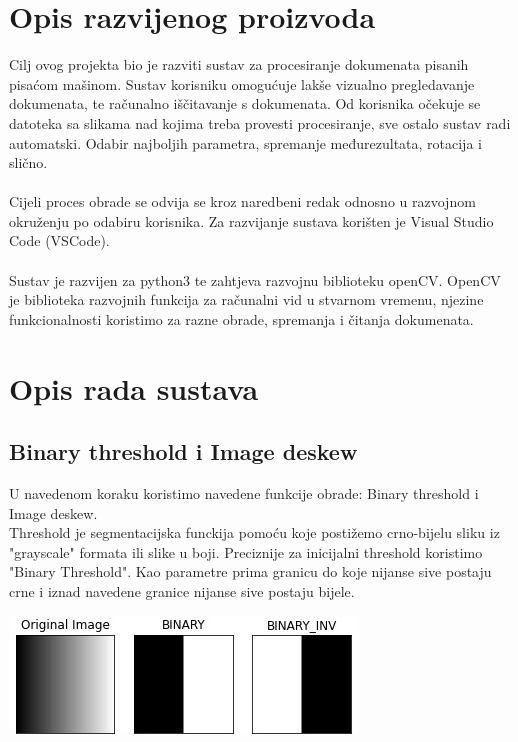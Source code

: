 \documentclass{article}
\begin{document}
\section{Opis razvijenog proizvoda}
Cilj ovog projekta bio je razviti sustav za procesiranje dokumenata pisanih pisaćom mašinom. Sustav korisniku omogućuje lakše vizualno pregledavanje dokumenata, te računalno iščitavanje s dokumenata. Od korisnika očekuje se datoteka sa slikama nad kojima treba provesti procesiranje, sve ostalo sustav radi automatski. Odabir najboljih parametra, spremanje međurezultata, rotacija i slično.\\
\\
Cijeli proces obrade se odvija se kroz naredbeni redak odnosno u razvojnom okruženju po odabiru korisnika. Za razvijanje sustava korišten je Visual Studio Code (VSCode).\\
\\
Sustav je razvijen za python3 te zahtjeva razvojnu biblioteku openCV. OpenCV je biblioteka razvojnih funkcija za računalni vid u stvarnom vremenu,  njezine funkcionalnosti koristimo za razne obrade, spremanja i čitanja dokumenata.

\section{Opis rada sustava}

\subsection{Binary threshold i Image deskew}

U navedenom koraku koristimo navedene funkcije obrade: Binary threshold i Image deskew.\\
Threshold je segmentacijska funckija pomoću koje postižemo crno-bijelu sliku iz "grayscale" formata ili slike u boji. Preciznije za inicijalni threshold koristimo "Binary Threshold". Kao parametre prima granicu do koje nijanse sive postaju crne i iznad navedene granice nijanse sive postaju bijele. %
\\
\begin{center}
    \includegraphics{binary_threshold.jpg}
\end{center}
\end{document}
